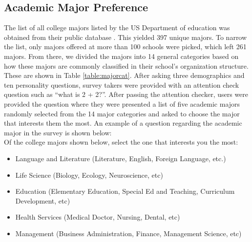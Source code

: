\documentclass[conference]{IEEEtran}
\begin{document}
\subsection{Academic Major Preference}\label{subsec2}
The list of all college majors listed by the US Department of education was obtained from their public database \cite{doe}. This yielded 397 unique majors. To narrow the list, only majors offered at more than 100 schools were picked, which left 261 majors. From there, we divided the majors into 14 general categories based on how these majors are commonly classified in their school’s organization structure. These are shown in Table \ref{table:majorcat}.
After asking three demographics and ten personality questions, survey takers were provided with an attention check question such as “what is 2 + 2?”. After passing the attention checker, users were provided the question where they were presented a list of five academic majors randomly selected from the 14 major categories and asked to
choose the major that interests them the most. An example of a question regarding the academic major in the survey is shown below:\\


\hline 
\vspace{8pt}
Of the college majors shown below, select the one that interests you the most: 
\begin{itemize}
\item Language and Literature (Literature, English, Foreign Language, etc.) 
\item Life Science (Biology, Ecology, Neuroscience, etc) 
\item Education (Elementary Education, Special Ed and Teaching, Curriculum Development, etc) 
\item Health Services (Medical Doctor, Nursing, Dental, etc) 
\item Management (Business Administration, Finance, Management Science, etc) 
\vspace{8pt}
\end{itemize}
\hline 


\end{document}
